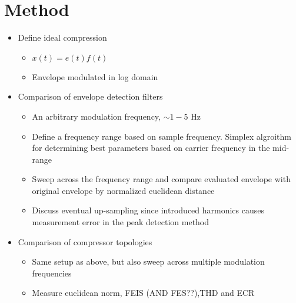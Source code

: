 \documentclass[../main2.tex]{subfiles}
\providecommand{\rootdir}{..}
\begin{document}
\section{Method}
\begin{itemize}
\item{Define ideal compression}
\begin{itemize}
	\item{$x(t) = e(t)f(t)$}
	\item{Envelope modulated in log domain}
\end{itemize}
\item{Comparison of envelope detection filters}
\begin{itemize}
	\item{An arbitrary modulation frequency, $\sim 1-5$ Hz}	
	\item{Define a frequency range based on sample frequency. Simplex algroithm for determining best parameters based on carrier frequency in the mid-range}
	\item{Sweep across the frequency range and compare evaluated envelope with original envelope by normalized euclidean distance}
	\item{Discuss eventual up-sampling since introduced harmonics causes measurement error in the peak detection method}
\end{itemize}
\item{Comparison of compressor topologies}
\begin{itemize}
	\item{Same setup as above, but also sweep across multiple modulation frequencies}
	\item{Measure euclidean norm, FEIS (AND FES??),THD and ECR}
\end{itemize}
\end{itemize}




\end{document}
